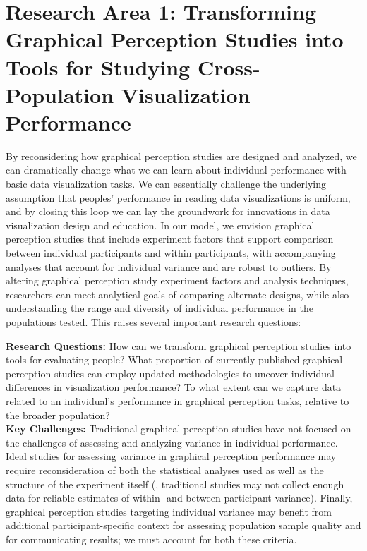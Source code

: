 \documentclass[11pt]{article}
\begin{document}
\section{Research Area 1: Transforming Graphical Perception Studies into Tools for Studying Cross-Population Visualization Performance}
By reconsidering how graphical perception studies are designed and analyzed, we can dramatically change what we can learn about individual performance with basic data visualization tasks.
We can essentially challenge the underlying assumption that peoples' performance in reading data visualizations is uniform, and by closing this loop we can lay the groundwork for innovations in data visualization design and education.
In our model, we envision graphical perception studies that include experiment factors that support comparison between individual participants and within participants, with accompanying analyses that account for individual variance and are robust to outliers.
By altering graphical perception study experiment factors and analysis techniques, researchers can meet analytical goals of comparing alternate designs, while also understanding the range and diversity of individual performance in the populations tested.
This raises several important research questions:

\noindent\hrulefill

\vspace{-0.5em}
\noindent\textbf{Research Questions:}
How can we transform graphical perception studies into tools for evaluating people?
What proportion of currently published graphical perception studies can employ updated methodologies to uncover individual differences in visualization performance?
To what extent can we capture data related to an individual's performance in graphical perception tasks, relative to the broader population?
\\
\noindent\textbf{Key Challenges:}
Traditional graphical perception studies have not focused on the challenges of assessing and analyzing variance in individual performance.
Ideal studies for assessing variance in graphical perception performance may require reconsideration of both the statistical analyses used as well as the structure of the experiment itself (\eg, traditional studies may not collect enough data for reliable estimates of within- and between-participant variance).
Finally, graphical perception studies targeting individual variance may benefit from additional participant-specific context for assessing population sample quality and for communicating results; we must account for both these criteria.
\end{document}
